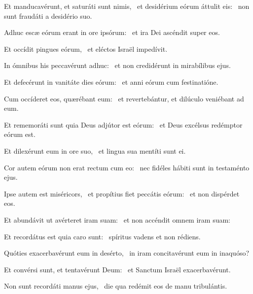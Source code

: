 \item Et manducavérunt, et saturáti sunt nimis,~\pscross{} et desidérium eórum áttulit eis:~\psstar{} non sunt fraudáti a desidério suo.

\item Adhuc escæ eórum erant in ore ipsórum:~\psstar{} et ira Dei ascéndit super eos.

\item Et occídit pingues eórum,~\psstar{} et eléctos Israël impedívit.

\item In ómnibus his peccavérunt adhuc:~\psstar{} et non credidérunt in mirabílibus ejus.

\item Et defecérunt in vanitáte dies eórum:~\psstar{} et anni eórum cum festinatióne.

\item Cum occíderet eos, quærébant eum:~\psstar{} et revertebántur, et dilúculo veniébant ad eum.

\item Et rememoráti sunt quia Deus adjútor est eórum:~\psstar{} et Deus excélsus redémptor eórum est.

\item Et dilexérunt eum in ore suo,~\psstar{} et lingua sua mentíti sunt ei.

\item Cor autem eórum non erat rectum cum eo:~\psstar{} nec fidéles hábiti sunt in testaménto ejus.

\item Ipse autem est miséricors,~\pscross{} et propítius fiet peccátis eórum:~\psstar{} et non dispérdet eos.

\item Et abundávit ut avérteret iram suam:~\psstar{} et non accéndit omnem iram suam:

\item Et recordátus est quia caro sunt:~\psstar{} spíritus vadens et non rédiens.

\item Quóties exacerbavérunt eum in desérto,~\psstar{} in iram concitavérunt eum in inaquóso?

\item Et convérsi sunt, et tentavérunt Deum:~\psstar{} et Sanctum Israël exacerbavérunt.

\item Non sunt recordáti manus ejus,~\psstar{} die qua redémit eos de manu tribulántis.


